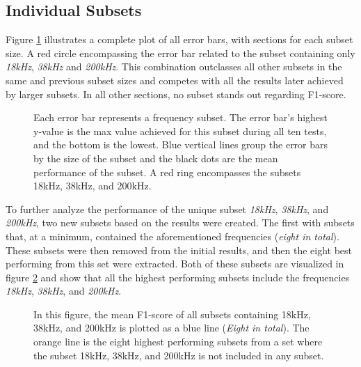     \subsection{Individual Subsets}
        Figure \ref{errorbar_fig} illustrates a complete plot of all error bars, with sections for each subset size. A red circle encompassing the error bar related to the subset containing only \textit{18kHz}, \textit{38kHz} and \textit{200kHz}. This combination outclasses all other subsets in the same and previous subset sizes and competes with all the results later achieved by larger subsets. In all other sections, no subset stands out regarding F1-score.
        \clearpage
        \begin{figure}[H]
            \centering
                        
            \caption[Error bars per combination]{Each error bar represents a frequency subset. The error bar's highest y-value is the max value achieved for this subset during all ten tests, and the bottom is the lowest. Blue vertical lines group the error bars by the size of the subset and the black dots are the mean performance of the subset. A red ring encompasses the subsets 18kHz, 38kHz, and 200kHz.}
          	\medskip 
            \label{errorbar_fig}
        \end{figure}
    
        To further analyze the performance of the unique subset \textit{18kHz}, \textit{38kHz}, and \textit{200kHz}, two new subsets based on the results were created. The first with subsets that, at a minimum, contained the aforementioned frequencies (\textit{eight in total}). These subsets were then removed from the initial results, and then the eight best performing from this set were extracted. Both of these subsets are visualized in figure \ref{with_without_figure} and show that all the highest performing subsets include the frequencies \textit{18kHz}, \textit{38kHz}, and \textit{200kHz}.
        
        \begin{figure}[H] 
            \centering
            
            \caption[With and without unique subset]{In this figure, the mean F1-score of all subsets containing 18kHz, 38kHz, and 200kHz is plotted as a blue line (\textit{Eight in total}). The orange line is the eight highest performing subsets from a set where the subset 18kHz, 38kHz, and 200kHz is not included in any subset.}
          	\medskip 
            \label{with_without_figure}
        \end{figure}
        
